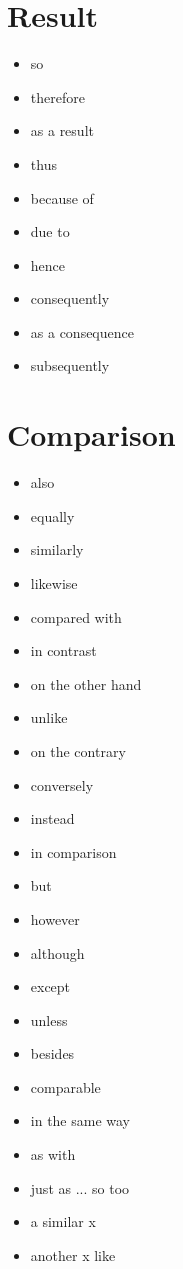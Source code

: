 \documentclass[twocolumn, a4paper]{article}
\begin{document}

\section{Result}
{\color{OrangeRed}
	\begin{itemize}[leftmargin=*, noitemsep]
		\item so
		\item therefore
		\item as a result
		\item thus
		\item because of
		\item due to
		\item hence
		\item consequently
		\item as a consequence
		\item subsequently
	\end{itemize}
}

\section{Comparison}
{\color{orange}
	\begin{itemize}[leftmargin=*, noitemsep]
		\item also
		\item equally
		\item similarly
		\item likewise
		\item compared with
		\item in contrast
		\item on the other hand
		\item unlike
		\item on the contrary
		\item conversely
		\item instead
		\item in comparison
		\item but
		\item however
		\item although
		\item except
		\item unless
		\item besides
		\item comparable
		\item in the same way
		\item as with
		\item just as ... so too
		\item a similar x
		\item another x like
	\end{itemize}
}
\end{document}
